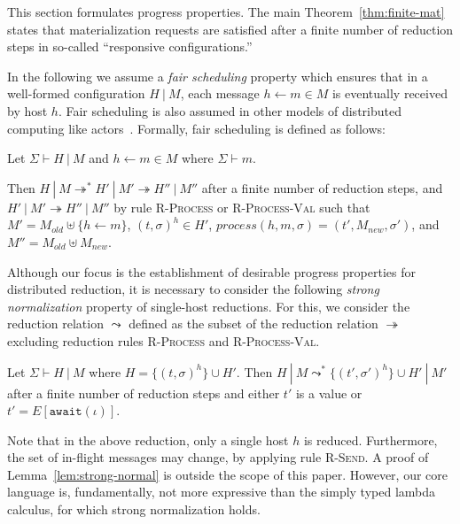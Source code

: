 This section formulates progress properties. The main
Theorem~\ref{thm:finite-mat} states that materialization requests are
satisfied after a finite number of reduction steps in so-called
``responsive configurations.''

In the following we assume a {\em fair scheduling} property which
ensures that in a well-formed configuration $H~|~M$, each message $h
\leftarrow m \in M$ is eventually received by host $h$. Fair
scheduling is also assumed in other models of distributed computing
like actors~\cite{Actors,Talcott}. Formally, fair scheduling is
defined as follows:

\begin{defn}\label{def:fair-scheduling}
  Let $\Sigma \vdash H~|~M$ and $h \leftarrow m \in M$ where $\Sigma
  \vdash m$.

  Then $H~|~M \twoheadrightarrow^* H'~|~M' \twoheadrightarrow
  H''~|~M''$ after a finite number of reduction steps, and $H'~|~M'
  \twoheadrightarrow H''~|~M''$ by rule \textsc{R-Process} or
  \textsc{R-Process-Val} such that $M' = M_{old} \uplus \{h \leftarrow
  m\}$, $(t, \sigma)^h \in H'$, $process(h, m, \sigma) = (t', M_{new},
  \sigma')$, and $M'' = M_{old} \uplus M_{new}$.
\end{defn}

Although our focus is the establishment of desirable progress
properties for distributed reduction, it is necessary to consider the
following {\em strong normalization} property of single-host
reductions. For this, we consider the reduction relation $\leadsto$
defined as the subset of the reduction relation $\twoheadrightarrow$
excluding reduction rules \textsc{R-Process} and
\textsc{R-Process-Val}.

\begin{lem}\label{lem:strong-normal}
  Let $\Sigma \vdash H~|~M$ where $H = \{ (t, \sigma)^h \} \cup
  H'$. Then $H~|~M \leadsto^* \{ (t', \sigma')^h \} \cup H'~|~M'$
  after a finite number of reduction steps and either $t'$ is a value
  or $t' = E[\texttt{await}(\iota)]$.
\end{lem}

Note that in the above reduction, only a single host $h$ is
reduced. Furthermore, the set of in-flight messages may change, \eg
by applying rule \textsc{R-Send}. A proof of
Lemma~\ref{lem:strong-normal} is outside the scope of this
paper. However, our core language is, fundamentally, not more
expressive than the simply typed lambda calculus, for which strong
normalization holds.

